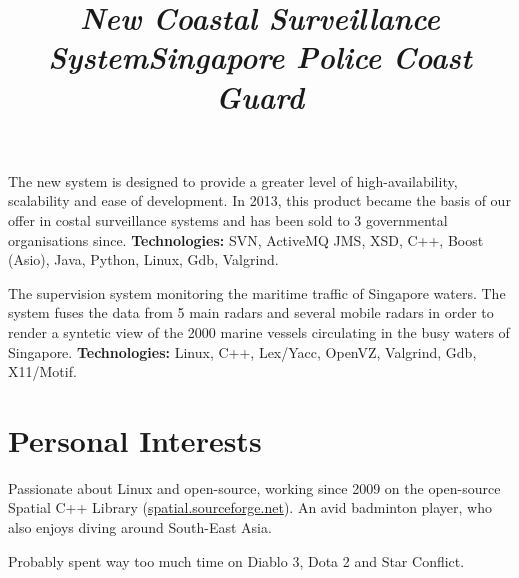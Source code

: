 \documentclass[overlapped,line,letterpaper]{res}
\begin{document}
\begin{resume}
  \title{\em New Coastal Surveillance System}
  \begin{position}
    The new system is designed to provide a greater level of high-availability,
    scalability and ease of development. In 2013, this product became the basis
    of our offer in costal surveillance systems and has been sold to 3
    governmental organisations since.
    \newline
    {\bf Technologies:} SVN, ActiveMQ JMS, XSD, C++, Boost (Asio), Java, Python, Linux,
    Gdb, Valgrind.
  \end{position}

  \title{\em Singapore Police Coast Guard}
  \begin{position}
    The supervision system monitoring the maritime traffic of
    Singapore waters. The system fuses the data from 5 main radars and
    several mobile radars in order to render a syntetic view of the 2000
    marine vessels circulating in the busy waters of Singapore.
    \newline
    {\bf Technologies:} Linux, C++, Lex/Yacc, OpenVZ, Valgrind, Gdb, X11/Motif.
  \end{position}



  \section{\bf Personal Interests}

  Passionate about Linux and open-source, working since 2009 on the open-source
  Spatial C++ Library
  (\href{http://spatial.sourceforge.net}{spatial.sourceforge.net}). An avid
  badminton player, who also enjoys diving around South-East Asia.

  Probably spent way too much time on Diablo 3, Dota 2 and Star Conflict.
  


\end{resume}
\end{document}
